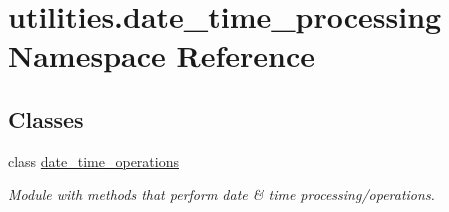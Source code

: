 \hypertarget{namespaceutilities_1_1date__time__processing}{}\section{utilities.\+date\+\_\+time\+\_\+processing Namespace Reference}
\label{namespaceutilities_1_1date__time__processing}
\subsection*{Classes}
\begin{DoxyCompactItemize}
\item 
class \hyperlink{classutilities_1_1date__time__processing_1_1date__time__operations}{date\+\_\+time\+\_\+operations}
\begin{DoxyCompactList}\small\item\em Module with methods that perform date \& time processing/operations. \end{DoxyCompactList}\end{DoxyCompactItemize}
